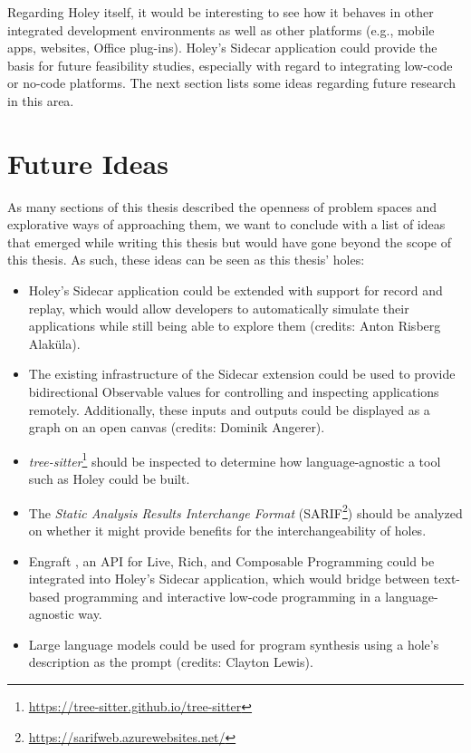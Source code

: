 Regarding Holey itself, it would be interesting to see how it behaves in other integrated development environments as well as other platforms (e.g., mobile apps, websites, Office plug-ins).
Holey's Sidecar application could provide the basis for future feasibility studies, especially with regard to integrating low-code or no-code platforms.
The next section lists some ideas regarding future research in this area.


\section{Future Ideas}
\label{sec:discussion-future-ideas}
As many sections of this thesis described the openness of problem spaces and explorative ways of approaching them, we want to conclude with a list of ideas that emerged while writing this thesis but would have gone beyond the scope of this thesis.
As such, these ideas can be seen as this thesis' holes:
\begin{itemize}
    \item Holey's Sidecar application could be extended with support for record and replay, which would allow developers to automatically simulate their applications while still being able to explore them (credits: Anton Risberg Alaküla).
    \item The existing infrastructure of the Sidecar extension could be used to provide bidirectional Observable values for controlling and inspecting applications remotely. Additionally, these inputs and outputs could be displayed as a graph on an open canvas (credits: Dominik Angerer).
    \item \emph{tree-sitter}\footnote{\url{https://tree-sitter.github.io/tree-sitter}} should be inspected to determine how language-agnostic a tool such as Holey could be built.
    \item The \emph{Static Analysis Results Interchange Format} (SARIF\footnote{\url{https://sarifweb.azurewebsites.net/}}) should be analyzed on whether it might provide benefits for the interchangeability of holes.
    \item Engraft \cite{horowitz_engraft_2023}, an API for Live, Rich, and Composable Programming could be integrated into Holey's Sidecar application, which would bridge between text-based programming and interactive low-code programming in a language-agnostic way.
    \item Large language models could be used for program synthesis using a hole's description as the prompt (credits: Clayton Lewis).
\end{itemize}


